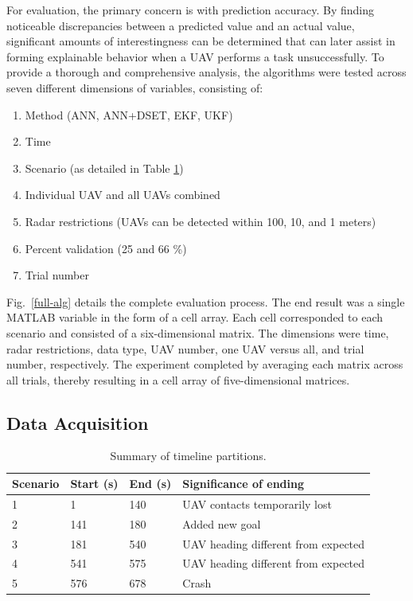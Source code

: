 \documentclass[12pt]{uthesis-v12}  %
\begin{document}
For evaluation, the primary concern is with prediction accuracy. By finding noticeable discrepancies between a predicted value and an actual value, significant amounts of interestingness can be determined that can later assist in forming explainable behavior when a UAV performs a task unsuccessfully.  To provide a thorough and comprehensive analysis, the algorithms were tested across seven different dimensions of variables, consisting of:
\begin{enumerate}
\item Method (ANN, ANN+DSET, EKF, UKF)
\item Time
\item Scenario (as detailed in Table \ref{partition})
\item Individual UAV and all UAVs combined
\item Radar restrictions (UAVs can be detected within 100, 10, and 1 meters)
\item Percent validation (25 and 66 \%)
\item Trial number
\end{enumerate}
Fig.~\ref{full-alg} details the complete evaluation process. The end result was a single MATLAB variable in the form of a cell array. Each cell corresponded to each scenario and consisted of a six-dimensional matrix. The dimensions were time, radar restrictions, data type, UAV number, one UAV versus all, and trial number, respectively. The experiment completed by averaging each matrix across all trials, thereby resulting in a cell array of five-dimensional matrices.

\subsection{Data Acquisition}
\label{data}

\begin{table}[!t]
\caption{Summary of timeline partitions.}
\renewcommand{\arraystretch}{1.3}
\centering
{\begin{tabular}{*{4}{l}}
\toprule
Scenario & Start (s) & End (s) & Significance of ending \\ \midrule
1 & 1 & 140 & UAV contacts temporarily lost \\
2 & 141 & 180 & Added new goal \\
3 & 181 & 540 & UAV heading different from expected \\
4 & 541 & 575 & UAV heading different from expected \\
5 & 576 & 678 & Crash \\ \bottomrule
\end{tabular}}

\label{partition}
\end{table}
\end{document}
